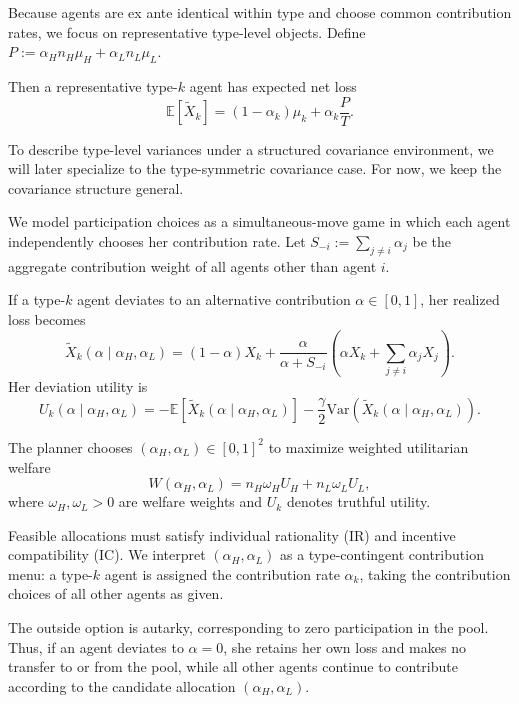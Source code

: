 \documentclass[a4paper,12pt]{article}
\theoremstyle{definition}
\theoremstyle{remark}
\newcommand{\E}{\mathbb{E}}
\newcommand{\Var}{\mathrm{Var}}
\newcommand{\1}{\mathbf{1}}
\begin{document}
Because agents are ex ante identical within type and choose common contribution rates, we focus on representative type-level objects. Define \(P:=\alpha_H n_H\mu_H+\alpha_L n_L\mu_L\).

Then a representative type-\(k\) agent has expected net loss
\begin{equation}\label{eq:mean-type-general}
\E[\tilde X_k]
=
(1-\alpha_k)\mu_k+\alpha_k\frac{P}{T}.
\end{equation}

To describe type-level variances under a structured covariance environment, we will later specialize to the type-symmetric covariance case. For now, we keep the covariance structure general.

We model participation choices as a simultaneous-move game in which each agent independently chooses her contribution rate. Let $S_{-i}:=\sum_{j\neq i}\alpha_j$ be the aggregate contribution weight of all agents other than agent $i$.

If a type-\(k\) agent deviates to an alternative contribution \(\alpha\in[0,1]\), her realized loss becomes
\begin{equation}\label{eq:devloss-general}
\tilde X_k(\alpha\mid \alpha_H,\alpha_L)
=
(1-\alpha)X_k
+
\frac{\alpha}{\alpha+S_{-i}}
\left(
\alpha X_k+\sum_{j\neq i}\alpha_j X_j
\right).
\end{equation}
Her deviation utility is
\begin{equation}\label{eq:devutility-general}
U_k(\alpha\mid \alpha_H,\alpha_L)
=
-\E[\tilde X_k(\alpha\mid \alpha_H,\alpha_L)]
-\frac{\gamma}{2}\Var(\tilde X_k(\alpha\mid \alpha_H,\alpha_L)).
\end{equation}


The planner chooses \((\alpha_H,\alpha_L)\in[0,1]^2\) to maximize weighted utilitarian welfare
\begin{equation}\label{eq:welfare-general}
W(\alpha_H,\alpha_L)
=
n_H\omega_H U_H
+
n_L\omega_L U_L,
\end{equation}
where \(\omega_H,\omega_L>0\) are welfare weights and \(U_k\) denotes truthful utility.


Feasible allocations must satisfy individual rationality (IR) and incentive compatibility (IC). 
We interpret \((\alpha_H,\alpha_L)\) as a type-contingent contribution menu: a type-\(k\) agent is assigned the contribution rate \(\alpha_k\), taking the contribution choices of all other agents as given.

The outside option is autarky, corresponding to zero participation in the pool. 
Thus, if an agent deviates to \(\alpha=0\), she retains her own loss and makes no transfer to or from the pool, while all other agents continue to contribute according to the candidate allocation \((\alpha_H,\alpha_L)\).
\end{document}
